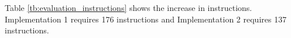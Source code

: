 Table \ref{tb:evaluation_instructions} shows the increase in instructions.
Implementation 1 requires 176 instructions and Implementation 2 requires 137
instructions.
%



  

  

